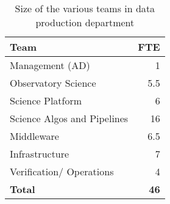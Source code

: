  \begin{longtable} { |p{}  |r |} 
\caption{Size of the various teams in data production department \label{tab:FTE}}\\ 
\hline 
{Team}&{FTE } \\ \hline
{Management (AD)}&{1} \\ \hline
{Observatory Science }&{5.5} \\ \hline
{Science Platform}&{6} \\ \hline
{Science Algos and Pipelines}&{16} \\ \hline
{Middleware}&{6.5} \\ \hline
{Infrastructure}&{7} \\ \hline
{Verification/ Operations}&{4} \\ \hline
\textbf{Total}&\textbf{46} \\ \hline
\end{longtable}
